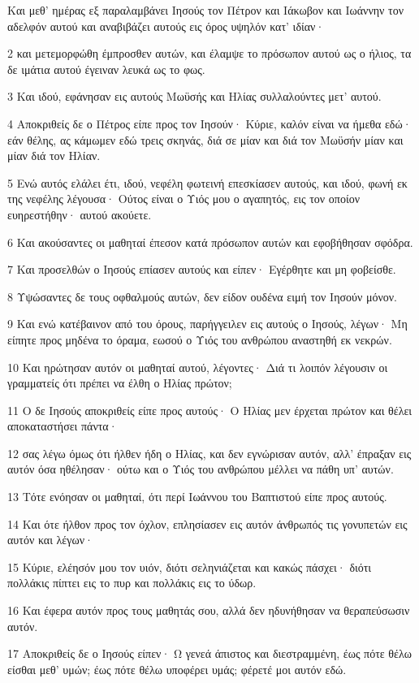 \par Και μεθ' ημέρας εξ παραλαμβάνει Ιησούς τον Πέτρον και Ιάκωβον και Ιωάννην τον αδελφόν αυτού και αναβιβάζει αυτούς εις όρος υψηλόν κατ' ιδίαν·
\par 2 και μετεμορφώθη έμπροσθεν αυτών, και έλαμψε το πρόσωπον αυτού ως ο ήλιος, τα δε ιμάτια αυτού έγειναν λευκά ως το φως.
\par 3 Και ιδού, εφάνησαν εις αυτούς Μωϋσής και Ηλίας συλλαλούντες μετ' αυτού.
\par 4 Αποκριθείς δε ο Πέτρος είπε προς τον Ιησούν· Κύριε, καλόν είναι να ήμεθα εδώ· εάν θέλης, ας κάμωμεν εδώ τρεις σκηνάς, διά σε μίαν και διά τον Μωϋσήν μίαν και μίαν διά τον Ηλίαν.
\par 5 Ενώ αυτός ελάλει έτι, ιδού, νεφέλη φωτεινή επεσκίασεν αυτούς, και ιδού, φωνή εκ της νεφέλης λέγουσα· Ούτος είναι ο Υιός μου ο αγαπητός, εις τον οποίον ευηρεστήθην· αυτού ακούετε.
\par 6 Και ακούσαντες οι μαθηταί έπεσον κατά πρόσωπον αυτών και εφοβήθησαν σφόδρα.
\par 7 Και προσελθών ο Ιησούς επίασεν αυτούς και είπεν· Εγέρθητε και μη φοβείσθε.
\par 8 Υψώσαντες δε τους οφθαλμούς αυτών, δεν είδον ουδένα ειμή τον Ιησούν μόνον.
\par 9 Και ενώ κατέβαινον από του όρους, παρήγγειλεν εις αυτούς ο Ιησούς, λέγων· Μη είπητε προς μηδένα το όραμα, εωσού ο Υιός του ανθρώπου αναστηθή εκ νεκρών.
\par 10 Και ηρώτησαν αυτόν οι μαθηταί αυτού, λέγοντες· Διά τι λοιπόν λέγουσιν οι γραμματείς ότι πρέπει να έλθη ο Ηλίας πρώτον;
\par 11 Ο δε Ιησούς αποκριθείς είπε προς αυτούς· Ο Ηλίας μεν έρχεται πρώτον και θέλει αποκαταστήσει πάντα·
\par 12 σας λέγω όμως ότι ήλθεν ήδη ο Ηλίας, και δεν εγνώρισαν αυτόν, αλλ' έπραξαν εις αυτόν όσα ηθέλησαν· ούτω και ο Υιός του ανθρώπου μέλλει να πάθη υπ' αυτών.
\par 13 Τότε ενόησαν οι μαθηταί, ότι περί Ιωάννου του Βαπτιστού είπε προς αυτούς.
\par 14 Και ότε ήλθον προς τον όχλον, επλησίασεν εις αυτόν άνθρωπός τις γονυπετών εις αυτόν και λέγων·
\par 15 Κύριε, ελέησόν μου τον υιόν, διότι σεληνιάζεται και κακώς πάσχει· διότι πολλάκις πίπτει εις το πυρ και πολλάκις εις το ύδωρ.
\par 16 Και έφερα αυτόν προς τους μαθητάς σου, αλλά δεν ηδυνήθησαν να θεραπεύσωσιν αυτόν.
\par 17 Αποκριθείς δε ο Ιησούς είπεν· Ω γενεά άπιστος και διεστραμμένη, έως πότε θέλω είσθαι μεθ' υμών; έως πότε θέλω υποφέρει υμάς; φέρετέ μοι αυτόν εδώ.
